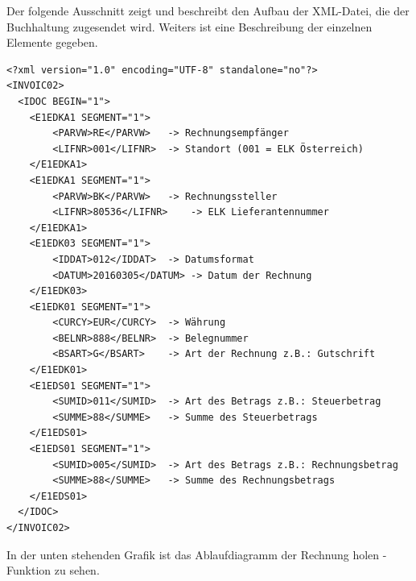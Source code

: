 \newpage
Der folgende Ausschnitt zeigt und beschreibt den Aufbau der XML-Datei, die der Buchhaltung zugesendet wird. Weiters ist eine Beschreibung der einzelnen Elemente gegeben.
\begin{lstlisting}
<?xml version="1.0" encoding="UTF-8" standalone="no"?>
<INVOIC02>
  <IDOC BEGIN="1">
    <E1EDKA1 SEGMENT="1">
      	<PARVW>RE</PARVW>	-> Rechnungsempfänger
      	<LIFNR>001</LIFNR> 	-> Standort (001 = ELK Österreich)
    </E1EDKA1>
    <E1EDKA1 SEGMENT="1">
      	<PARVW>BK</PARVW>	-> Rechnungssteller
      	<LIFNR>80536</LIFNR>	-> ELK Lieferantennummer
    </E1EDKA1>
    <E1EDK03 SEGMENT="1">
      	<IDDAT>012</IDDAT>	-> Datumsformat
      	<DATUM>20160305</DATUM>	-> Datum der Rechnung
    </E1EDK03>
    <E1EDK01 SEGMENT="1">
      	<CURCY>EUR</CURCY>	-> Währung
      	<BELNR>888</BELNR>	-> Belegnummer
      	<BSART>G</BSART>	-> Art der Rechnung z.B.: Gutschrift
    </E1EDK01>
    <E1EDS01 SEGMENT="1">
      	<SUMID>011</SUMID>	-> Art des Betrags z.B.: Steuerbetrag
      	<SUMME>88</SUMME>	-> Summe des Steuerbetrags
    </E1EDS01>
    <E1EDS01 SEGMENT="1">
      	<SUMID>005</SUMID>	-> Art des Betrags z.B.: Rechnungsbetrag
      	<SUMME>88</SUMME>	-> Summe des Rechnungsbetrags
    </E1EDS01>
  </IDOC>
</INVOIC02>
\end{lstlisting}
\newpage
In der unten stehenden Grafik ist das Ablaufdiagramm der \glqq Rechnung holen\grqq{} -Funktion zu sehen.
